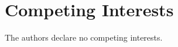 \documentclass[fleqn,10pt]{wlscirep}
\begin{document}
\section*{Competing Interests}

The authors declare no competing interests.




%
%
%
\end{document}
